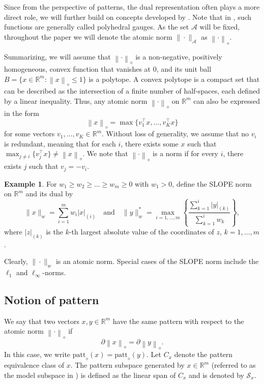 \documentclass[12pt]{amsart}
\numberwithin{equation}{section}
\numberwithin{equation}{section}
\theoremstyle{definition}
\newtheorem{example}[thm]{Example}
\newcommand{\R}{\mathbb{R}}
\newcommand{\poly}[1]{\left\|#1\right\|_\diamond}
\renewcommand{\SS}{\mathcal{S}}
\newcommand{\patt}[1]{\mathrm{patt}_{\diamond}\!\left(#1\right)}
\begin{document}
Since from the perspective of patterns, the dual representation often plays a more direct role, we will further build on concepts developed by \cite{POLYNORMS}. Note that in \cite{POLYNORMS}, such functions are generally called polyhedral gauges.
As the set $\mathcal{A}$ will be fixed, 
throughout the paper we will denote the atomic norm $\|\cdot\|_{\mathcal{A}}$ as $\poly{\cdot}$. 


Summarizing, we will assume that $\poly{\cdot}$ is a non-negative, positively homogeneous, convex function that vanishes at $0$, and its unit ball $B = \{x\in\R^m\colon \poly{x}\leq 1 \}$ is a polytope. A convex polytope is a compact set that can be described as the intersection of a finite number of half-spaces, each defined by a linear inequality.
Thus, any atomic norm $\poly{\cdot}$ on $\R^m$ can also be expressed in the form
\begin{equation}\label{eq:atomicnorm}
\poly{x} = \max\{v_1^\top x,\ldots,v_K^\top x\}
\end{equation}
for some vectors $v_1,\ldots, v_K\in\R^m$. Without loss of generality, we assume that no $v_i$ is redundant, meaning that for each $i$, there exists some $x$ such that $\max_{j\neq i}\{v_j^\top x\}\neq \poly{x}$. We note that $\poly{\cdot}$ is a norm if for every $i$, there exists $j$ such that $v_j=-v_i$.






\begin{example}\label{ex:SLOPE}
 For $w_1\geq w_2\geq\ldots \geq  w_m\geq 0$ with $w_1>0$, define the SLOPE norm on $\R^m$ and its dual by
 \[
	\|x\|_w = \sum_{i=1}^{m} w_i |x|_{(i)}
	\quad\mbox{and}\quad 
	\| y\|_{w}^\ast = \max_{i=1,\ldots,m}\left\{\frac{ \sum_{k=1}^i |y|_{(k)}}{\sum_{k=1}^i w_k}\right\},
	\]
    where $|z|_{(k)}$ is the $k$-th largest absolute value of the coordinates of $z$, $k=1,\ldots,m$. 

    

Clearly, $\|\cdot\|_w$ is an atomic norm. Special cases of the SLOPE norm include the $\ell_1$ and $\ell_\infty$-norms.
\end{example}

\subsection{Notion of pattern}\label{sec:pattern}

We say that two vectors $x, y\in\R^m$ have the same pattern with respect to the atomic norm $\poly{\cdot}$ if
\[
\partial \poly{x} = \partial \poly{y}.   
\]
In this case, we write $\patt{x}=\patt{y}$. Let $C_x$ denote the pattern equivalence class of $x$. 
The pattern subspace generated by $x\in \R^m$ (referred to as the model subspace in \cite{Vaiter15,Vaiter18}) is defined as the linear span of $C_x$ and is denoted by $\SS_x$.  
\end{document}
